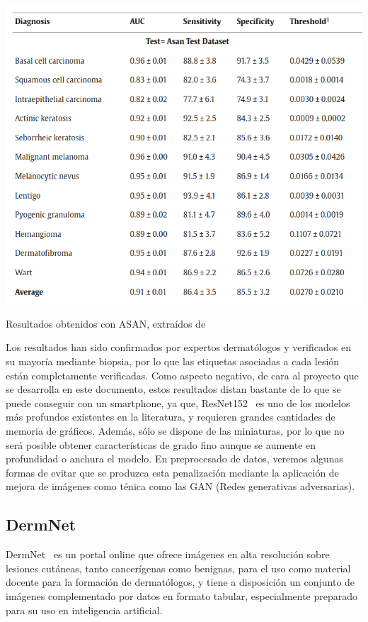 \begin{table}[H]
	\centering
	\includegraphics[scale = 0.45]{imagenes/results_asan.png}
	\caption{Resultados obtenidos con ASAN, extraídos de \cite{HAN20189}}
	\label{fig:resultadosasan}
\end{table}

Los resultados han sido confirmados por expertos dermatólogos y verificados en su mayoría mediante biopsia, por lo que las etiquetas asociadas a cada lesión están completamente verificadas. Como aspecto negativo, de cara al proyecto que se desarrolla en este documento, estos resultados distan bastante de lo que se puede conseguir con un smartphone, ya que, ResNet152~\cite{he2015deep} es uno de los modelos más profundos existentes en la literatura, y requieren grandes cantidades de memoria de gráficos. Además, sólo se dispone de las miniaturas, por lo que no será posible obtener características de grado fino aunque se aumente en profundidad o anchura el modelo. En preprocesado de datos, veremos algunas formas de evitar que se produzca esta penalización mediante la aplicación de mejora de imágenes como ténica como las GAN (Redes generativas adversarias)\cite{goodfellow2014generative}.

\subsection{DermNet}

DermNet~\cite{dermnetz} es un portal online que ofrece imágenes en alta resolución sobre lesiones cutáneas, tanto cancerígenas como benignas, para el uso como material docente para la formación de dermatólogos, y tiene a disposición un conjunto de imágenes complementado por datos en formato tabular, especialmente preparado para su uso en inteligencia artificial.

